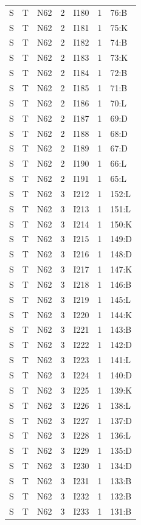 {\begin{longtable}{lllrlrp{.35\linewidth}}
S & T & N62 & 2 & I180 & 1 & 76:B \\
S & T & N62 & 2 & I181 & 1 & 75:K \\
S & T & N62 & 2 & I182 & 1 & 74:B \\
S & T & N62 & 2 & I183 & 1 & 73:K \\
S & T & N62 & 2 & I184 & 1 & 72:B \\
S & T & N62 & 2 & I185 & 1 & 71:B \\
S & T & N62 & 2 & I186 & 1 & 70:L \\
S & T & N62 & 2 & I187 & 1 & 69:D \\
S & T & N62 & 2 & I188 & 1 & 68:D \\
S & T & N62 & 2 & I189 & 1 & 67:D \\
S & T & N62 & 2 & I190 & 1 & 66:L \\
S & T & N62 & 2 & I191 & 1 & 65:L \\
S & T & N62 & 3 & I212 & 1 & 152:L \\
S & T & N62 & 3 & I213 & 1 & 151:L \\
S & T & N62 & 3 & I214 & 1 & 150:K \\
S & T & N62 & 3 & I215 & 1 & 149:D \\
S & T & N62 & 3 & I216 & 1 & 148:D \\
S & T & N62 & 3 & I217 & 1 & 147:K \\
S & T & N62 & 3 & I218 & 1 & 146:B \\
S & T & N62 & 3 & I219 & 1 & 145:L \\
S & T & N62 & 3 & I220 & 1 & 144:K \\
S & T & N62 & 3 & I221 & 1 & 143:B \\
S & T & N62 & 3 & I222 & 1 & 142:D \\
S & T & N62 & 3 & I223 & 1 & 141:L \\
S & T & N62 & 3 & I224 & 1 & 140:D \\
S & T & N62 & 3 & I225 & 1 & 139:K \\
S & T & N62 & 3 & I226 & 1 & 138:L \\
S & T & N62 & 3 & I227 & 1 & 137:D \\
S & T & N62 & 3 & I228 & 1 & 136:L \\
S & T & N62 & 3 & I229 & 1 & 135:D \\
S & T & N62 & 3 & I230 & 1 & 134:D \\
S & T & N62 & 3 & I231 & 1 & 133:B \\
S & T & N62 & 3 & I232 & 1 & 132:B \\
S & T & N62 & 3 & I233 & 1 & 131:B \\

\end{longtable}}
